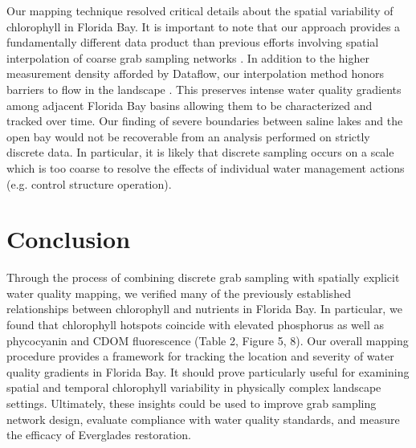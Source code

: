 Our mapping technique resolved critical details about the spatial variability of chlorophyll in Florida Bay. It is important to note that our approach provides a fundamentally different data product than previous efforts involving spatial interpolation of coarse grab sampling networks \citep{fourqurean1993process}. In addition to the higher measurement density afforded by Dataflow, our interpolation method honors barriers to flow in the landscape \citep{stachelek_application_2015}. This preserves intense water quality gradients among adjacent Florida Bay basins allowing them to be characterized and tracked over time. Our finding of severe boundaries between saline lakes and the open bay would not be recoverable from an analysis performed on strictly discrete data. In particular, it is likely that discrete sampling occurs on a scale which is too coarse to resolve the effects of individual water management actions (e.g. control structure operation).

\section{Conclusion}
\label{conclusion}

	Through the process of combining discrete grab sampling with spatially explicit water quality mapping, we verified many of the previously established relationships between chlorophyll and nutrients in Florida Bay. In particular, we found that chlorophyll hotspots coincide with elevated phosphorus as well as phycocyanin and CDOM fluorescence (Table 2, Figure 5, 8). Our overall mapping procedure provides a framework for tracking the location and severity of water quality gradients in Florida Bay. It should prove particularly useful for examining spatial and temporal chlorophyll variability in physically complex landscape settings.	Ultimately, these insights could be used to improve grab sampling network design, evaluate compliance with water quality standards, and measure the efficacy of Everglades restoration.


%

